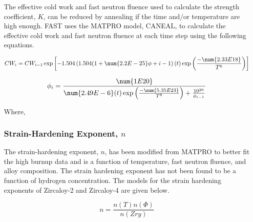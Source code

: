 The effective cold work and fast neutron fluence used to calculate the strength coefficient, $K$,
can be reduced by annealing if the time and/or temperature are high enough. FAST uses the MATPRO
model, CANEAL, to calculate the effective cold work and fast neutron fluence at each time step using
the following equations.

\begin{equation}
    CW_i=CW_{i-1}\exp \left[-1.504 \left(1.504(1+\num{2.2E-25} \phi+{i-1} \right) (t) \exp \left( \frac{-\num{2.33E18}}{T^6} \right) \right]
\end{equation}

\begin{equation}
    \phi_i= \frac{\num{1E20}}{\num{2.49E-6}(t) \exp \left( \frac{-\num{5.35E23}}{T^8} \right)+\frac{10^{20}}{\phi_{i-1}}}
\end{equation}

Where,


\subsubsection{Strain-Hardening Exponent, $n$}\label{section:strain-hardening-exponent-n}

The strain-hardening exponent, $n$, has been modified from MATPRO to better fit the high burnup data
and is a function of temperature, fast neutron fluence, and alloy composition. The strain hardening
exponent has not been found to be a function of hydrogen concentration.  The models for the strain
hardening exponents of Zircaloy-2 and Zircaloy-4 are given below.

\begin{equation}
    \label{eq:strain_hardening_n}
    n = \frac{n(T) n(\Phi )}{n(Zry)}
\end{equation}

